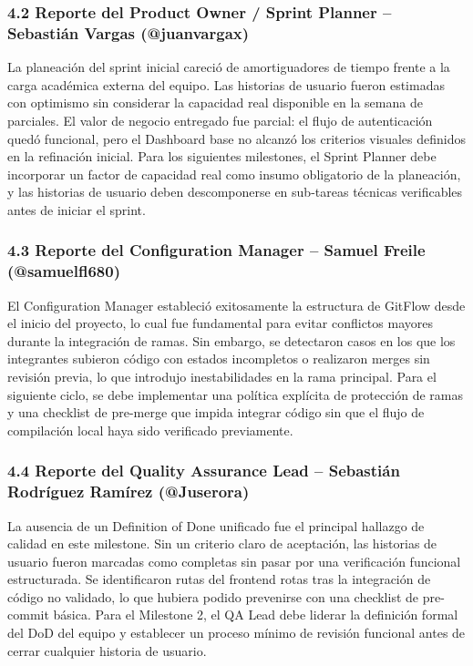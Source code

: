 \documentclass[11pt,a4paper]{article}
\begin{document}
\subsubsection{4.2 Reporte del Product Owner / Sprint Planner -- Sebastián Vargas (@juanvargax)}

La planeación del sprint inicial careció de amortiguadores de tiempo frente a la carga académica externa del equipo. Las historias de usuario fueron estimadas con optimismo sin considerar la capacidad real disponible en la semana de parciales. El valor de negocio entregado fue parcial: el flujo de autenticación quedó funcional, pero el Dashboard base no alcanzó los criterios visuales definidos en la refinación inicial. Para los siguientes milestones, el Sprint Planner debe incorporar un factor de capacidad real como insumo obligatorio de la planeación, y las historias de usuario deben descomponerse en sub-tareas técnicas verificables antes de iniciar el sprint.

\subsubsection{4.3 Reporte del Configuration Manager -- Samuel Freile (@samuelfl680)}

El Configuration Manager estableció exitosamente la estructura de GitFlow desde el inicio del proyecto, lo cual fue fundamental para evitar conflictos mayores durante la integración de ramas. Sin embargo, se detectaron casos en los que los integrantes subieron código con estados incompletos o realizaron merges sin revisión previa, lo que introdujo inestabilidades en la rama principal. Para el siguiente ciclo, se debe implementar una política explícita de protección de ramas y una checklist de pre-merge que impida integrar código sin que el flujo de compilación local haya sido verificado previamente.

\subsubsection{4.4 Reporte del Quality Assurance Lead -- Sebastián Rodríguez Ramírez (@Juserora)}

La ausencia de un Definition of Done unificado fue el principal hallazgo de calidad en este milestone. Sin un criterio claro de aceptación, las historias de usuario fueron marcadas como completas sin pasar por una verificación funcional estructurada. Se identificaron rutas del frontend rotas tras la integración de código no validado, lo que hubiera podido prevenirse con una checklist de pre-commit básica. Para el Milestone 2, el QA Lead debe liderar la definición formal del DoD del equipo y establecer un proceso mínimo de revisión funcional antes de cerrar cualquier historia de usuario.
\end{document}
